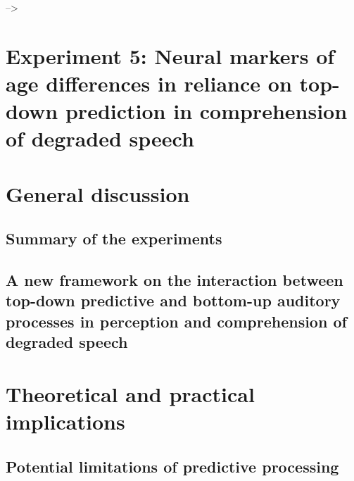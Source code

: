 \documentclass[a4paper, nobind]{templates/ociamthesis}
\begin{document}
\minitoc

--\textgreater{}

\hypertarget{experiment-5-neural-markers-of-age-differences-in-reliance-on-top-down-prediction-in-comprehension-of-degraded-speech}{%
\chapter{Experiment 5: Neural markers of age differences in reliance on top-down prediction in comprehension of degraded speech}\label{experiment-5-neural-markers-of-age-differences-in-reliance-on-top-down-prediction-in-comprehension-of-degraded-speech}}

\minitoc

\hypertarget{general-discussion}{%
\chapter{General discussion}\label{general-discussion}}

\hypertarget{summary-of-the-experiments}{%
\section{Summary of the experiments}\label{summary-of-the-experiments}}

\hypertarget{a-new-framework-on-the-interaction-between-top-down-predictive-and-bottom-up-auditory-processes-in-perception-and-comprehension-of-degraded-speech}{%
\section{A new framework on the interaction between top-down predictive and bottom-up auditory processes in perception and comprehension of degraded speech}\label{a-new-framework-on-the-interaction-between-top-down-predictive-and-bottom-up-auditory-processes-in-perception-and-comprehension-of-degraded-speech}}

\minitoc 

\hypertarget{theoretical-and-practical-implications}{%
\chapter{Theoretical and practical implications}\label{theoretical-and-practical-implications}}

\hypertarget{potential-limitations-of-predictive-processing}{%
\section{Potential limitations of predictive processing}\label{potential-limitations-of-predictive-processing}}
\end{document}
